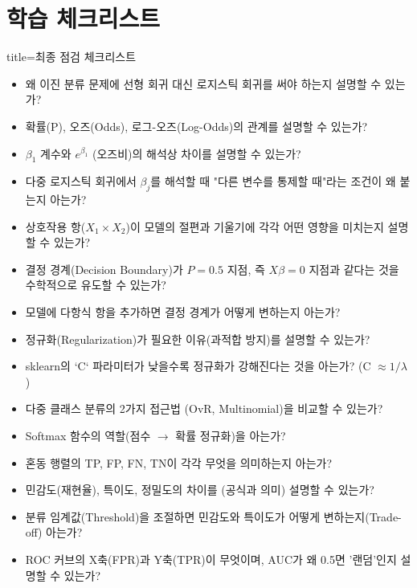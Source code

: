 \documentclass[11pt,a4paper]{book}
\theoremstyle{definition}
\begin{document}
\section{학습 체크리스트}

\begin{tcolorbox}{title=최종 점검 체크리스트}
\begin{itemize}
    \item[$\square$] 왜 이진 분류 문제에 선형 회귀 대신 로지스틱 회귀를 써야 하는지 설명할 수 있는가?
    \item[$\square$] 확률(P), 오즈(Odds), 로그-오즈(Log-Odds)의 관계를 설명할 수 있는가?
    \item[$\square$] $\beta_1$ 계수와 $e^{\beta_1}$ (오즈비)의 해석상 차이를 설명할 수 있는가?
    \item[$\square$] 다중 로지스틱 회귀에서 $\beta_j$를 해석할 때 "다른 변수를 통제할 때"라는 조건이 왜 붙는지 아는가?
    \item[$\square$] 상호작용 항($X_1 \times X_2$)이 모델의 절편과 기울기에 각각 어떤 영향을 미치는지 설명할 수 있는가?
    \item[$\square$] 결정 경계(Decision Boundary)가 $P=0.5$ 지점, 즉 $X\beta=0$ 지점과 같다는 것을 수학적으로 유도할 수 있는가?
    \item[$\square$] 모델에 다항식 항을 추가하면 결정 경계가 어떻게 변하는지 아는가?
    \item[$\square$] 정규화(Regularization)가 필요한 이유(과적합 방지)를 설명할 수 있는가?
    \item[$\square$] sklearn의 `C` 파라미터가 낮을수록 정규화가 강해진다는 것을 아는가? (C $\approx 1/\lambda$)
    \item[$\square$] 다중 클래스 분류의 2가지 접근법 (OvR, Multinomial)을 비교할 수 있는가?
    \item[$\square$] Softmax 함수의 역할(점수 $\to$ 확률 정규화)을 아는가?
    \item[$\square$] 혼동 행렬의 TP, FP, FN, TN이 각각 무엇을 의미하는지 아는가?
    \item[$\square$] 민감도(재현율), 특이도, 정밀도의 차이를 (공식과 의미) 설명할 수 있는가?
    \item[$\square$] 분류 임계값(Threshold)을 조절하면 민감도와 특이도가 어떻게 변하는지(Trade-off) 아는가?
    \item[$\square$] ROC 커브의 X축(FPR)과 Y축(TPR)이 무엇이며, AUC가 왜 0.5면 '랜덤'인지 설명할 수 있는가?
\end{itemize}
\end{tcolorbox}
\end{document}
